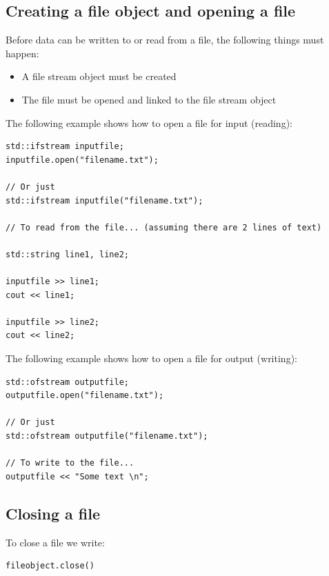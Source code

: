 \documentclass{report}
\begin{document}
    \pagebreak \bigbreak \noindent 
    \subsection{Creating a file object and opening a file}
    \bigbreak \noindent 
    Before data can be written to or read from a file, the following things must happen:
    \begin{itemize}
        \item A file stream object must be created
        \item The file must be opened and linked to the file stream object
    \end{itemize}
    \bigbreak \noindent 
    The following example shows how to open a file for input (reading):
    \bigbreak \noindent 
    \sepline
    \begin{verbatim}
std::ifstream inputfile;
inputfile.open("filename.txt");

// Or just
std::ifstream inputfile("filename.txt");

// To read from the file... (assuming there are 2 lines of text)

std::string line1, line2;

inputfile >> line1;
cout << line1;

inputfile >> line2;
cout << line2;
    \end{verbatim}
    \sepline
    \bigbreak \noindent 
    The following example shows how to open a file for output (writing):
    \bigbreak \noindent 
    \sepline
    \begin{verbatim}
std::ofstream outputfile;
outputfile.open("filename.txt");

// Or just
std::ofstream outputfile("filename.txt");

// To write to the file...
outputfile << "Some text \n";

    \end{verbatim}
    \sepline

    \bigbreak \noindent 
    \subsection{Closing a file}
    \bigbreak \noindent 
    To close a file we write:
    \bigbreak \noindent 
    \sepline
    \begin{verbatim}
fileobject.close()
    \end{verbatim}
    \sepline

    \pagebreak \bigbreak \noindent 
\end{document}
